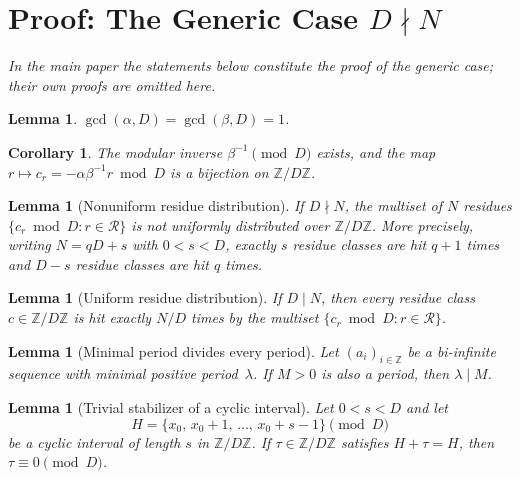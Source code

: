 \documentclass[11pt,reqno]{amsart}
\theoremstyle{plain}
\newtheorem{lemma}[theorem]{Lemma}
\newtheorem{corollary}[theorem]{Corollary}
\theoremstyle{definition}
\theoremstyle{remark}
\begin{document}
\section{\texorpdfstring{Proof: The Generic Case \(D \nmid N\)}{Proof: The Generic Case D does not divide N}}\label{sec:proof}

\emph{In the main paper the statements below constitute the proof of the
generic case; their own proofs are omitted here.}

\begin{lemma}\label{lem:gcd}
\(\gcd(\alpha, D) = \gcd(\beta, D) = 1\).
\end{lemma}

\begin{corollary}\label{cor:inverse}
The modular inverse \(\beta^{-1} \pmod{D}\) exists, and the map
\(r \mapsto c_r = -\alpha\beta^{-1}r \bmod D\) is a bijection on
\(\mathbb{Z}/D\mathbb{Z}\).
\end{corollary}

\begin{lemma}[Nonuniform residue distribution]\label{lem:nonuniform}
If \(D \nmid N\), the multiset of \(N\) residues
\(\{c_r \bmod D : r \in \mathcal{R}\}\) is not uniformly distributed over
\(\mathbb{Z}/D\mathbb{Z}\).  More precisely, writing \(N = qD + s\) with
\(0 < s < D\), exactly \(s\) residue classes are hit \(q+1\) times and
\(D - s\) residue classes are hit \(q\) times.
\end{lemma}

\begin{lemma}[Uniform residue distribution]\label{lem:uniform}
If \(D \mid N\), then every residue class \(c \in \mathbb{Z}/D\mathbb{Z}\) is
hit exactly \(N/D\) times by the multiset
\(\{c_r \bmod D : r \in \mathcal{R}\}\).
\end{lemma}

\begin{lemma}[Minimal period divides every period]
\label{lem:minperiod_divides_periods}
Let \((a_i)_{i\in\mathbb Z}\) be a bi-infinite sequence with minimal
positive period~\(\lambda\).  If \(M > 0\) is also a period, then
\(\lambda \mid M\).
\end{lemma}

\begin{lemma}[Trivial stabilizer of a cyclic interval]
\label{lem:cyclic_interval_stabilizer}
Let \(0 < s < D\) and let
\[
    H = \{x_0,\, x_0+1,\, \ldots,\, x_0+s-1\} \pmod{D}
\]
be a cyclic interval of length \(s\) in \(\mathbb{Z}/D\mathbb{Z}\).
If \(\tau \in \mathbb{Z}/D\mathbb{Z}\) satisfies \(H + \tau = H\),
then \(\tau \equiv 0 \pmod{D}\).
\end{lemma}
\end{document}
